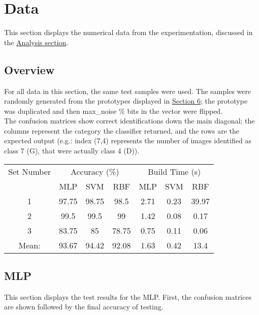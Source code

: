 \documentclass{article}
\begin{document}
\pagebreak
\section{Data} \label{S5}
	This section displays the numerical data from the experimentation, discussed in the \hyperref[S3]{Analysis section}.\\

	\subsection{Overview}\label{S51}
		For all data in this section, the same test samples were used. The samples were randomly generated from the prototypes displayed in \hyperref[S6]{Section 6}; the prototype was duplicated and then max\_noise \% bits in the vector were flipped.\\
		The confusion matrices show correct identifications down the main diagonal; the columns represent the category the classifier returned, and the rows are the expected output (e.g.: index (7,4) represents the number of images identified as class 7 (G), that were actually class 4 (D)).\\
		
		\begin{minipage}{\linewidth}
			\centering
				\begin{tabular}{c|ccc|ccc}\label{OverallRes}
					Set Number & \multicolumn{3}{c}{Accuracy (\%)}	& \multicolumn{3}{c}{Build Time (s)} \\
					& MLP & SVM & RBF & MLP & SVM & RBF \\
					\hline
					1			& 97.75 & 98.75 & 98.5 & 2.71 & 0.23 & 39.97 	\\
					2			& 99.5 & 99.5 & 99 & 1.42 & 0.08 & 0.17  \\
					3			& 83.75 & 85 & 78.75 & 0.75 & 0.11 & 0.06 	\\
					\hline
					Mean: &93.67 & 94.42 & 92.08 & 1.63 &0.42&13.4 \\
				\end{tabular}
		\end{minipage}
		
		\subsection{MLP}
			This section displays the test results for the MLP. First, the confusion matrices are shown followed by the final accuracy of testing.
			
\end{document}
